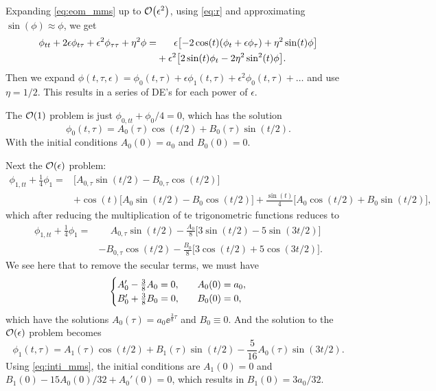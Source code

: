 \documentclass[11pt,letter, swedish, english,%
]{article}
\begin{document}
Expanding \eqref{eq:eom_mms} up to $\order{\epsilon^2}$, using
\eqref{eq:r} and approximating $\sin(\phi)\approx\phi$, we get
\begin{equation}
\begin{aligned}
\phi_{tt}+2\epsilon\phi_{t\tau}+\epsilon^2\phi_{\tau\tau}+\eta^2\phi
=&\hspace{18pt}
\epsilon\qty[-2\cos(t)(\phi_t+\epsilon\phi_\tau)+\eta^2\sin(t)\phi]\\
&+\epsilon^2\qty[2\sin(t)\phi_t-2\eta^2\sin^2(t)\phi].
\end{aligned}
\end{equation}
Then we expand 
$\phi(t,\tau,\epsilon)=\phi_0(t,\tau)+
\epsilon\phi_1(t,\tau)+\epsilon^2\phi_0(t,\tau)+\ldots$ and use
$\eta=1/2$. This results in a series of DE's for each power of
$\epsilon$. 

The $\order{1}$ problem is just $\phi_{0,tt}+\phi_0/4=0$, which has the
solution
\begin{equation}
\phi_0(t,\tau)=A_0(\tau)\cos(t/2)+B_0(\tau)\sin(t/2).
\end{equation}
With the initial conditions $A_0(0)=a_0$ and $B_0(0)=0$.

Next the $\order{\epsilon}$ problem: 
\begin{equation}
\begin{aligned}
\phi_{1, tt}+\frac{1}{4}\phi_1=&\Big[A_{0,\tau}\sin(t/2)-B_{0, \tau}\cos(t/2)\Big]\\
&+\cos(t)\Big[A_0\sin(t/2)-B_0\cos(t/2)\Big]
+\frac{\sin(t)}{4}\Big[A_0\cos(t/2)+B_0\sin(t/2)\Big],
\end{aligned}
\end{equation}
which after reducing the multiplication of te trigonometric functions
reduces to
\begin{equation}
\begin{aligned}
\phi_{1, tt}+\frac{1}{4}\phi_1=&\phantom{+}A_{0,\tau}\sin(t/2)
-\frac{A_0}{8}\Big[3\sin(t/2)-5\sin(3t/2)\Big]\\
&{-}B_{0, \tau}\cos(t/2)
-\frac{B_0}{8}\Big[3\cos(t/2)+5\cos(3t/2)\Big].
\end{aligned}
\end{equation}
We see here that to remove the secular terms, we must have
\begin{equation}
\begin{cases}
A_0'-\frac{3}{8}A_0=0\qcomma&A_0(0)=a_0,\\
B_0'+\frac{3}{8}B_0=0\qcomma&B_0(0)=0,
\end{cases}
\end{equation}
which have the solutions $A_0(\tau)=a_0\ee^{\frac{3}{8}\tau}$ and
$B_0\equiv0$. And the solution to the $\order{\epsilon}$ problem
becomes
\begin{equation}
\phi_1(t, \tau)=A_1(\tau)\cos(t/2)+B_1(\tau)\sin(t/2)
-\frac{5}{16}A_0(\tau)\sin(3t/2).
\end{equation}
Using \eqref{eq:inti_mms}, the initial conditions are $A_1(0)=0$ and
$B_1(0)-15A_0(0)/32 + A_0'(0)=0$, which results in $B_1(0)=3a_0/32$.
\end{document}
